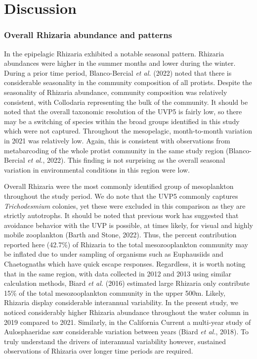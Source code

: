 \documentclass[
]{article}
\begin{document}
\hypertarget{discussion}{%
\section{Discussion}\label{discussion}}

\hypertarget{overall-rhizaria-abundance-and-patterns}{%
\subsubsection{Overall Rhizaria abundance and
patterns}\label{overall-rhizaria-abundance-and-patterns}}

In the epipelagic Rhizaria exhibited a notable seasonal pattern.
Rhizaria abundances were higher in the summer months and lower during
the winter. During a prior time period, Blanco-Bercial \emph{et al.}
(2022) noted that there is considerable seasonality in the community
composition of all protists. Despite the seasonality of Rhizaria
abundance, community composition was relatively consistent, with
Collodaria representing the bulk of the community. It should be noted
that the overall taxonomic resolution of the UVP5 is fairly low, so
there may be a switching of species within the broad groups identified
in this study which were not captured. Throughout the mesopelagic,
month-to-month variation in 2021 was relatively low. Again, this is
consistent with observations from metabarcoding of the whole protist
community in the same study region (Blanco-Bercial \emph{et al.}, 2022).
This finding is not surprising as the overall seasonal variation in
environmental conditions in this region were low.

Overall Rhizaria were the most commonly identified group of mesoplankton
throughout the study period. We do note that the UVP5 commonly captures
\emph{Trichodesmium} colonies, yet these were excluded in this
comparison as they are strictly autotrophs. It should be noted that
previous work has suggested that avoidance behavior with the UVP is
possible, at times likely, for visual and highly mobile zooplankton
(Barth and Stone, 2022). Thus, the percent contribution reported here
(42.7\%) of Rhizaria to the total mesozooplankton community may be
inflated due to under sampling of organisms such as Euphausiids and
Chaetognaths which have quick escape responses. Regardless, it is worth
noting that in the same region, with data collected in 2012 and 2013
using similar calculation methods, Biard \emph{et al.} (2016) estimated
large Rhizaria only contribute 15\% of the total mesozooplankton
community in the upper 500m. Likely, Rhizaria display considerable
interannual variability. In the present study, we noticed considerably
higher Rhizaria abundance throughout the water column in 2019 compared
to 2021. Similarly, in the California Current a multi-year study of
Aulosphaeridae saw considerable variation between years (Biard \emph{et
al.}, 2018). To truly understand the drivers of interannual variability
however, sustained observations of Rhizaria over longer time periods are
required.
\end{document}
